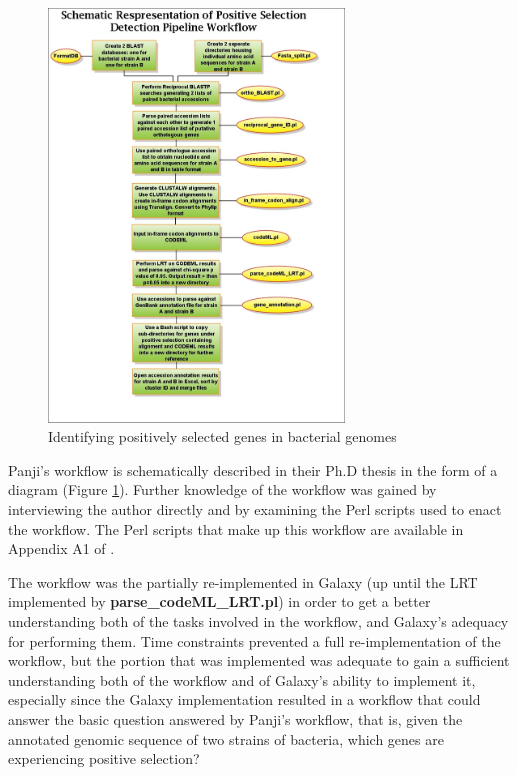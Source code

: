 \documentclass[a4paper,10pt]{scrreprt}
\begin{document}
\begin{figure}[!htb]
\centering
\includegraphics[width=0.7\textwidth]{sumir/Thesis_figures/Methods_section/pipeline_steps_mark_7}
\caption{Identifying positively selected genes in bacterial genomes}
\label{fig:sumir_pipeline}
\end{figure}

Panji's workflow is schematically described in their Ph.D thesis in the form of a diagram (Figure \ref{fig:sumir_pipeline}). Further knowledge of the workflow was gained by interviewing the author directly and by examining the Perl scripts used to enact the workflow.  The Perl scripts that make up this workflow are available in Appendix A1 of \cite{panji_identification_2009}.

The workflow was the partially re-implemented in Galaxy (up until the LRT implemented by \textbf{parse\_codeML\_LRT.pl}) in order to get a better understanding both of the tasks involved in the workflow, and Galaxy's adequacy for performing them. Time constraints prevented a full re-implementation of the workflow, but the portion that was implemented was adequate to gain a sufficient understanding both of the workflow and of Galaxy's ability to implement it, especially since the Galaxy implementation resulted in a workflow that could answer the basic question answered by Panji's workflow, that is, given the annotated genomic sequence of two strains of bacteria, which genes are experiencing positive selection?
\end{document}
